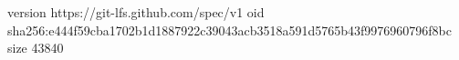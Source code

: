 version https://git-lfs.github.com/spec/v1
oid sha256:e444f59cba1702b1d1887922c39043acb3518a591d5765b43f9976960796f8bc
size 43840
